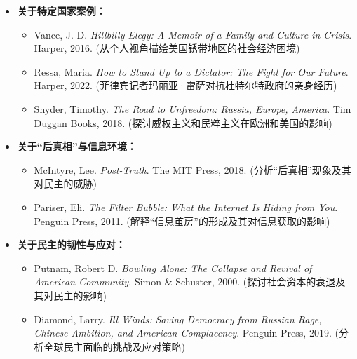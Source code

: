 \begin{itemize}
    \item \textbf{关于特定国家案例：}
    \begin{itemize}
        \item Vance, J. D. \textit{Hillbilly Elegy: A Memoir of a Family and Culture in Crisis}. Harper, 2016. (从个人视角描绘美国锈带地区的社会经济困境)
        \item Ressa, Maria. \textit{How to Stand Up to a Dictator: The Fight for Our Future}. Harper, 2022. (菲律宾记者玛丽亚·雷萨对抗杜特尔特政府的亲身经历)
        \item Snyder, Timothy. \textit{The Road to Unfreedom: Russia, Europe, America}. Tim Duggan Books, 2018. (探讨威权主义和民粹主义在欧洲和美国的影响)
    \end{itemize}

    \item \textbf{关于“后真相”与信息环境：}
    \begin{itemize}
        \item McIntyre, Lee. \textit{Post-Truth}. The MIT Press, 2018. (分析“后真相”现象及其对民主的威胁)
        \item Pariser, Eli. \textit{The Filter Bubble: What the Internet Is Hiding from You}. Penguin Press, 2011. (解释“信息茧房”的形成及其对信息获取的影响)
    \end{itemize}

    \item \textbf{关于民主的韧性与应对：}
    \begin{itemize}
        \item Putnam, Robert D. \textit{Bowling Alone: The Collapse and Revival of American Community}. Simon \& Schuster, 2000. (探讨社会资本的衰退及其对民主的影响)
        \item Diamond, Larry. \textit{Ill Winds: Saving Democracy from Russian Rage, Chinese Ambition, and American Complacency}. Penguin Press, 2019. (分析全球民主面临的挑战及应对策略)
    \end{itemize}
\end{itemize}